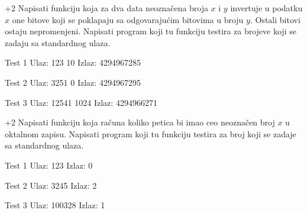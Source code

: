
\begin{Exercise}[label=211]\marker+{2}
  Napisati funkciju koja za dva data neoznačena broja $x$
  i $y$ invertuje u podatku $x$ one bitove koji se poklapaju
  sa odgovarajućim bitovima u broju $y$. Ostali bitovi ostaju
  nepromenjeni.  Napisati program koji tu funkciju testira za brojeve
  koji se zadaju sa standardnog ulaza.
  
\begin{minitest}
\begin{test}{Test 1}
Ulaz:   123 10        
Izlaz:  4294967285    
\end{test}
\end{minitest}
\begin{minitest}
\begin{test}{Test 2}
Ulaz:  3251 0    
Izlaz: 4294967295    
\end{test}
\end{minitest}
\begin{minitest}
\begin{test}{Test 3}
Ulaz:   12541 1024
Izlaz:  4294966271
\end{test}
\end{minitest}
\end{Exercise}

\begin{Exercise}[label=212]\marker+{2}
Napisati funkciju koja računa koliko petica bi imao ceo
  neoznačen broj $x$ u oktalnom zapisu. Napisati program koji
  tu funkciju testira za broj koji se zadaje sa standardnog ulaza.
  
\begin{minitest}
\begin{test}{Test 1}
Ulaz:   123        
Izlaz:  0             
\end{test}
\end{minitest}
\begin{minitest}
\begin{test}{Test 2}
Ulaz:   3245      
Izlaz:  2              
\end{test}
\end{minitest}
\begin{minitest}
\begin{test}{Test 3}
Ulaz:   100328
Izlaz:  1
\end{test}
\end{minitest}  
\end{Exercise}
